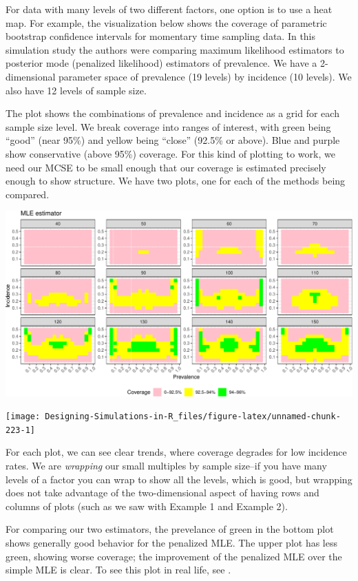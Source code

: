 \documentclass[
]{book}
\begin{document}
For data with many levels of two different factors, one option is to use a heat map.
For example, the visualization below shows the coverage of parametric bootstrap confidence intervals for momentary time sampling data.
In this simulation study the authors were comparing maximum likelihood estimators to posterior mode (penalized likelihood) estimators of prevalence.
We have a 2-dimensional parameter space of prevalence (19 levels) by incidence (10 levels).
We also have 12 levels of sample size.

The plot shows the combinations of prevalence and incidence as a grid for each sample size level.
We break coverage into ranges of interest, with green being ``good'' (near 95\%) and yellow being ``close'' (92.5\% or above).
Blue and purple show conservative (above 95\%) coverage.
For this kind of plotting to work, we need our MCSE to be small enough that our coverage is estimated precisely enough to show structure.
We have two plots, one for each of the methods being compared.

\begin{center}\includegraphics[width=0.75\linewidth]{Designing-Simulations-in-R_files/figure-latex/swan_example_setup-1} \end{center}

\begin{center}\texttt{[image: Designing-Simulations-in-R\_files/figure-latex/unnamed-chunk-223-1]} \end{center}

For each plot, we can see clear trends, where coverage degrades for low incidence rates.
We are \emph{wrapping} our small multiples by sample size--if you have many levels of a factor you can wrap to show all the levels, which is good, but wrapping does not take advantage of the two-dimensional aspect of having rows and columns of plots (such as we saw with Example 1 and Example 2).

For comparing our two estimators, the prevelance of green in the bottom plot shows generally good behavior for the penalized MLE. The upper plot has less green, showing worse coverage; the improvement of the penalized MLE over the simple MLE is clear.
To see this plot in real life, see \citet{pustejovsky2015four}.
\end{document}
